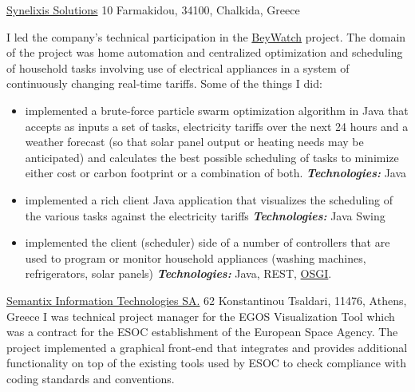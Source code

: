 \documentclass[helvetica,english,logo,notitle,totpages,utf8]{europecv2013}
\newcommand{\technologies}[0]{\textbf{\textit{Technologies:}}}
\begin{document}
\begin{europecv}
                   {\href{http://www.synelixis.com}{Synelixis Solutions}}
                   {10 Farmakidou, 34100, Chalkida, Greece}
                   {
    I led the company's technical participation in the \href{http://www.innovationseeds.eu/Virtual_Library/Results/BEYWATCH.kl}{BeyWatch} project. The domain of the project was home automation
    and centralized optimization and scheduling of household tasks involving use of electrical appliances
    in a system of continuously changing real-time tariffs.
    Some of the things I did:
    \begin{itemize}
    \item implemented a brute-force particle swarm optimization algorithm in Java that accepts as inputs
      a set of tasks, electricity tariffs over the next 24 hours and a weather forecast (so that solar
      panel output or heating needs may be anticipated) and calculates the best possible scheduling of
      tasks to minimize either cost or carbon footprint or a combination of both.
      \technologies{} Java
    \item implemented a rich client Java application that visualizes the scheduling of the various
      tasks against the electricity tariffs
      \technologies{} Java Swing
    \item implemented the client (scheduler) side of a number of controllers that are used to program or monitor
      household appliances (washing machines, refrigerators, solar panels)
      \technologies{} Java, REST, \href{https://www.osgi.org/}{OSGI}.
    \end{itemize}
                   }


                   {\href{http://www.semantix.gr}{Semantix Information Technologies SA.}}
                   {62 Konstantinou Tsaldari, 11476, Athens, Greece}
                   {
                     I was technical project manager for the EGOS Visualization Tool which was a contract for the ESOC
                     establishment of the European Space Agency. The project implemented a graphical front-end
                     that integrates and provides additional functionality on top of the existing tools used by ESOC to check
                     compliance with coding standards and conventions.
                   }


\end{europecv}
\end{document}
